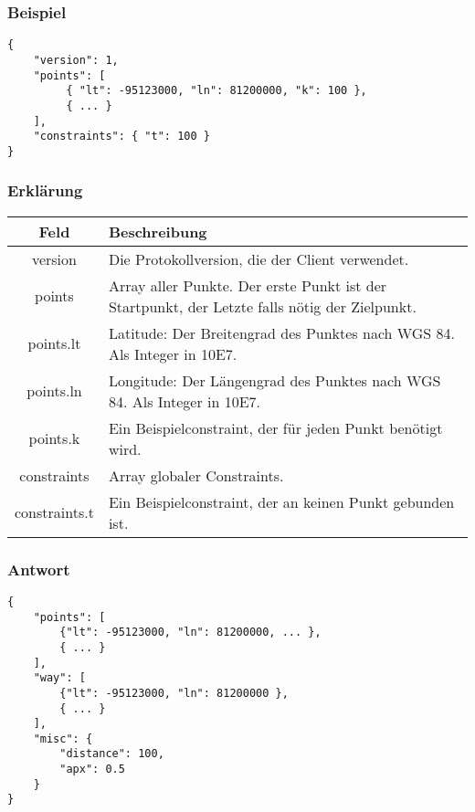 \documentclass[ngerman,titlepage,parskip=true]{scrartcl}
\begin{document}
\subsubsection{Beispiel}
	\begin{lstlisting}
{
    "version": 1,
    "points": [
         { "lt": -95123000, "ln": 81200000, "k": 100 },
         { ... }
    ],
    "constraints": { "t": 100 }
}    	
	\end{lstlisting}
	
		\subsubsection*{Erklärung}
	
	    \noindent \begin{tabular}{|c|p{12cm}|}
	    	\hline
	    	\textbf{Feld} & \textbf{Beschreibung} \\ 
	    	\hline \hline
	    	
	    	version & Die Protokollversion, die der Client verwendet.\\
	    	\hline
	    	
	    	points & Array aller Punkte. Der erste Punkt ist der Startpunkt, der Letzte falls nötig der Zielpunkt. \\ 
	    	\hline
	    	
	    	points.lt & Latitude: Der Breitengrad des Punktes nach WGS 84. Als Integer in 10E7. \\ 
	    	\hline
	    	
	    	points.ln & Longitude: Der Längengrad des Punktes nach WGS 84. Als Integer in 10E7. \\
	    	\hline
	    	
	    	points.k & Ein Beispielconstraint, der für jeden Punkt benötigt wird.\\ 
	    	\hline
	    	
	    	constraints & Array globaler Constraints.\\ 
	    	\hline
	    	
	    	constraints.t & Ein Beispielconstraint, der an keinen Punkt gebunden ist.\\ 
	    	\hline
	    \end{tabular}
    
    \subsubsection{Antwort}	
	\begin{lstlisting}
{
	"points": [
		{"lt": -95123000, "ln": 81200000, ... },
		{ ... }
	],
	"way": [
		{"lt": -95123000, "ln": 81200000 },
		{ ... }
	],
	"misc": {
		"distance": 100,
		"apx": 0.5
	}
}
	\end{lstlisting}
	
\end{document}
